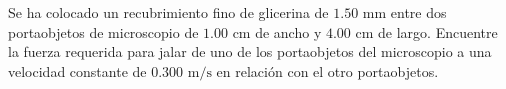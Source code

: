 \item Se ha colocado un recubrimiento fino de glicerina de $1.50 \text{ mm}$ entre dos portaobjetos de microscopio de $1.00 \text{ cm}$ de ancho y $4.00 \text{ cm}$ de largo. Encuentre la fuerza requerida para jalar de uno de los portaobjetos del microscopio a una velocidad constante de $0.300 \text{ m/s}$ en relación con el otro portaobjetos.
